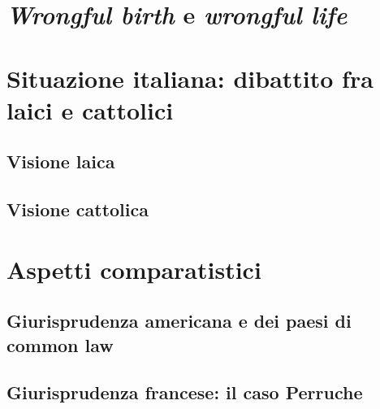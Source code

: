 \section{\textit{Wrongful birth} e \textit{wrongful life}}
\section{Situazione italiana: dibattito fra laici e cattolici}
\subsection{Visione laica}
\subsection{Visione cattolica}
\section{Aspetti comparatistici}
\subsection{Giurisprudenza americana e dei paesi di common law}
\subsection{Giurisprudenza francese: il caso Perruche}
